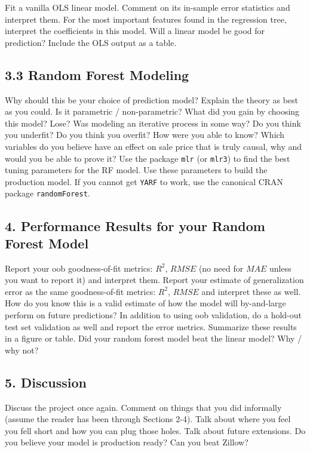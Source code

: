 \documentclass[12pt]{article}
\begin{document}
\begin{tcolorbox}
Fit a vanilla OLS linear model. Comment on its in-sample error statistics and interpret them. For the most important features found in the regression tree, interpret the coefficients in this model. Will a linear model be good for prediction? Include the OLS output as a table.

\subsection*{3.3 Random Forest Modeling}

Why should this be your choice of prediction model? Explain the theory as best as you could. Is it parametric / non-parametric? What did you gain by choosing this model? Lose? Was modeling an iterative process in some way? Do you think you underfit? Do you think you overfit? How were you able to know? Which variables do you believe have an effect on sale price that is truly causal, why and would you be able to prove it? Use the package \texttt{mlr} (or \texttt{mlr3}) to find the best tuning parameters for the RF model. Use these parameters to build the production model. If you cannot get \texttt{YARF} to work, use the canonical CRAN package \texttt{randomForest}.

\subsection*{4. Performance Results for your Random Forest Model}

Report your oob goodness-of-fit metrics: $R^2$, $RMSE$ (no need for $MAE$ unless you want to report it) and interpret them. Report your estimate of generalization error as the same goodness-of-fit metrics: $R^2$, $RMSE$ and interpret these as well. How do you know this is a valid estimate of how the model will by-and-large perform on future predictions? In addition to using oob validation, do a hold-out test set validation as well and report the error metrics. Summarize these results in a figure or table. Did your random forest model beat the linear model? Why / why not?

\subsection*{5. Discussion}

Discuss the project once again. Comment on things that you did informally (assume the reader has been through Sections 2-4). Talk about where you feel you fell short and how you can plug those holes. Talk about future extensions. Do you believe your model is production ready? Can you beat Zillow?



\end{tcolorbox}
\end{document}
